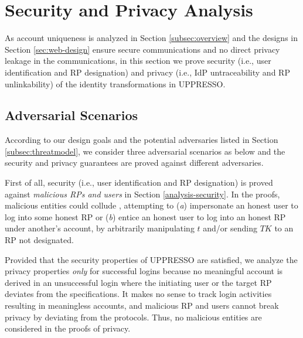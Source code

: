\section{Security and Privacy Analysis}
\label{sec:analysis}

As account uniqueness is analyzed in Section \ref{subsec:overview}
    and the designs in Section \ref{sec:web-design} ensure secure communications and no direct privacy leakage in the communications,
in this section we prove security (i.e., user identification and RP designation) and privacy (i.e., IdP untraceability and RP unlinkability) of the identity transformations in UPPRESSO.


\subsection{Adversarial Scenarios}

According to our design goals %
 and the potential adversaries listed in Section \ref{subsec:threatmodel}, we consider three adversarial scenarios as below
 and the security and privacy guarantees are proved against different adversaries.


First of all, security (i.e., user identification and RP designation) is proved against \emph{malicious RPs and users} in Section \ref{analysis-security}.
In the proofs, malicious entities could collude \cite{FettKS14,BrowserID,SPRESSO},
  attempting to (\emph{a}) impersonate an honest user to log into some honest RP
   or (\emph{b}) entice an honest user to log into an honest RP under another's account, 
by arbitrarily manipulating $t$ and/or sending $TK$ to an RP not designated.

Provided that the security properties of UPPRESSO are satisfied,
    we analyze the privacy properties \emph{only} for successful logins
    because no meaningful account is derived in an unsuccessful login
where the initiating user or the target RP deviates from the specifications.
It makes no sense to track login activities resulting in meaningless accounts, and
    malicious RP and users cannot break privacy by deviating from the protocols.
Thus, no malicious entities are considered in the proofs of privacy.

